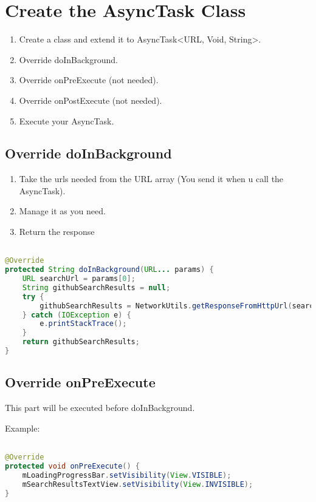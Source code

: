 \documentclass[12pt]{article} %
\begin{document}

\section{Create the AsyncTask Class}

\begin{enumerate}
	\item Create a class and extend it to AsyncTask<URL, Void, String>.
	\item Override doInBackground.
	\item Override onPreExecute (not needed).
	\item Override onPostExecute (not needed).
	\item Execute your AsyncTask.
\end{enumerate}

\subsection{Override doInBackground}
\begin{enumerate}
	\item Take the urls needed from the URL array (You send it when u call the AsyncTask).
	\item Manage it as you need.
	\item Return the response
\end{enumerate}

\begin{lstlisting}[language=Java]

@Override
protected String doInBackground(URL... params) {
	URL searchUrl = params[0];
	String githubSearchResults = null;
	try {
		githubSearchResults = NetworkUtils.getResponseFromHttpUrl(searchUrl);
	} catch (IOException e) {
		e.printStackTrace();
	}
	return githubSearchResults;
}

\end{lstlisting}


\subsection{Override onPreExecute}
This part will be executed before doInBackground.

Example:

\begin{lstlisting}[language=Java]

@Override
protected void onPreExecute() {
	mLoadingProgressBar.setVisibility(View.VISIBLE);
	mSearchResultsTextView.setVisibility(View.INVISIBLE);
}

\end{lstlisting}
\end{document}
